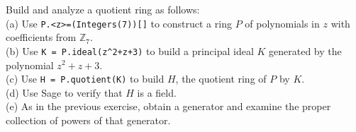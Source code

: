Build and analyze a quotient ring as follows:\\
(a) Use \verb?P.<z>=(Integers(7))[]? to construct a ring $P$ of polynomials in $z$ with coefficients from ${\mathbb Z}_7$.\\
(b) Use \verb?K = P.ideal(z^2+z+3)? to build a principal ideal $K$ generated by the polynomial $z^2+z+3$.\\
(c) Use \verb?H = P.quotient(K)? to build $H$, the quotient ring of $P$ by $K$.\\
(d) Use Sage to verify that $H$ is a field. \\
(e) As in the previous exercise, obtain a generator and examine the proper collection of powers of that generator.
\begin{sageverbatim}\end{sageverbatim}
